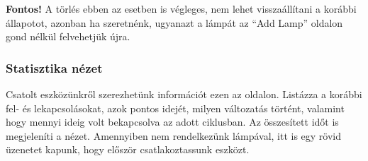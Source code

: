 \documentclass[a4paper,12pt]{report}
\begin{document}
    \textbf{Fontos!} A törlés ebben az esetben is végleges, nem lehet visszaállítani a korábbi állapotot, azonban ha szeretnénk,
    ugyanazt a lámpát az ``Add Lamp'' oldalon gond nélkül felvehetjük újra.

    \subsubsection{Statisztika nézet}
    Csatolt eszközünkről szerezhetünk információt ezen az oldalon. Listázza a korábbi fel- és lekapcsolásokat, azok pontos idejét,
    milyen változatás történt, valamint hogy mennyi ideig volt bekapcsolva az adott ciklusban. Az összesített időt is megjeleníti a
    nézet. Amennyiben nem rendelkezünk lámpával, itt is egy rövid üzenetet kapunk, hogy először csatlakoztassunk eszközt.
\end{document}
